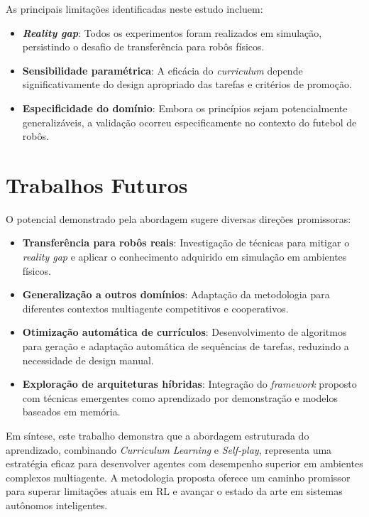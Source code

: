 As principais limitações identificadas neste estudo incluem:

\begin{itemize}
    \item \textbf{\textit{Reality gap}}: Todos os experimentos foram realizados em simulação, persistindo o desafio de transferência para robôs físicos.
    
    \item \textbf{Sensibilidade paramétrica}: A eficácia do \textit{curriculum} depende significativamente do design apropriado das tarefas e critérios de promoção.
    
    \item \textbf{Especificidade do domínio}: Embora os princípios sejam potencialmente generalizáveis, a validação ocorreu especificamente no contexto do futebol de robôs.
\end{itemize}

\section{Trabalhos Futuros}

O potencial demonstrado pela abordagem sugere diversas direções promissoras:

\begin{itemize}
    \item \textbf{Transferência para robôs reais}: Investigação de técnicas para mitigar o \textit{reality gap} e aplicar o conhecimento adquirido em simulação em ambientes físicos.
    
    \item \textbf{Generalização a outros domínios}: Adaptação da metodologia para diferentes contextos multiagente competitivos e cooperativos.
    
    \item \textbf{Otimização automática de currículos}: Desenvolvimento de algoritmos para geração e adaptação automática de sequências de tarefas, reduzindo a necessidade de design manual.
    
    \item \textbf{Exploração de arquiteturas híbridas}: Integração do \textit{framework} proposto com técnicas emergentes como aprendizado por demonstração e modelos baseados em memória.
\end{itemize}

Em síntese, este trabalho demonstra que a abordagem estruturada do aprendizado, combinando \textit{Curriculum Learning} e \textit{Self-play}, representa uma estratégia eficaz para desenvolver agentes com desempenho superior em ambientes complexos multiagente. A metodologia proposta oferece um caminho promissor para superar limitações atuais em RL e avançar o estado da arte em sistemas autônomos inteligentes.

